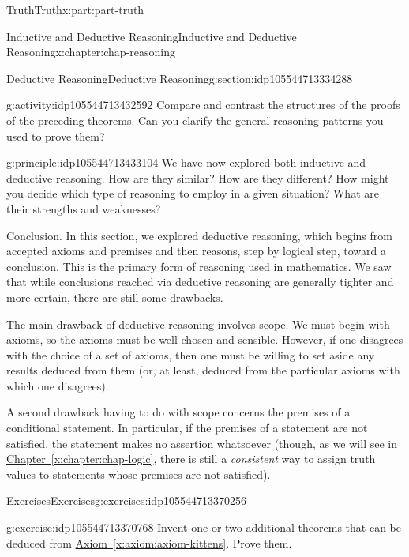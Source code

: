 \documentclass[oneside,10pt,]{book}
\newcommand{\xreffont}{\relax}
\numberwithin{equation}{section}
\begin{document}
\begin{partptx}{Truth}{}{Truth}{}{}{x:part:part-truth}
\begin{chapterptx}{Inductive and Deductive Reasoning}{}{Inductive and Deductive Reasoning}{}{}{x:chapter:chap-reasoning}
\begin{sectionptx}{Deductive Reasoning}{}{Deductive Reasoning}{}{}{g:section:idp105544713334288}
\begin{activity}{}{g:activity:idp105544713432592}
Compare and contrast the structures of the proofs of the preceding theorems. Can you clarify the general reasoning patterns you used to prove them?%
\end{activity}%
\begin{principle}{}{}{g:principle:idp105544713433104}%
We have now explored both inductive and deductive reasoning. How are they similar? How are they different? How might you decide which type of reasoning to employ in a given situation? What are their strengths and weaknesses?%
\end{principle}
\begin{conclusion}{Conclusion.}%
In this section, we explored deductive reasoning, which begins from accepted axioms and premises and then reasons, step by logical step, toward a conclusion. This is the primary form of reasoning used in mathematics. We saw that while conclusions reached via deductive reasoning are generally tighter and more certain, there are still some drawbacks.%
\par
The main drawback of deductive reasoning involves scope. We must begin with axioms, so the axioms must be well-chosen and sensible. However, if one disagrees with the choice of a set of axioms, then one must be willing to set aside any results deduced from them (or, at least, deduced from the particular axioms with which one disagrees).%
\par
A second drawback having to do with scope concerns the premises of a conditional statement. In particular, if the premises of a statement are not satisfied, the statement makes no assertion whatsoever (though, as we will see in \hyperref[x:chapter:chap-logic]{Chapter~{\xreffont\ref{x:chapter:chap-logic}}}, there is still a \emph{consistent} way to assign truth values to statements whose premises are not satisfied).%
\end{conclusion}%
%
%
\typeout{************************************************}
\typeout{************************************************}
%
\begin{exercises-subsection-numberless}{Exercises}{}{Exercises}{}{}{g:exercises:idp105544713370256}
\begin{divisionexercise}{1}{}{}{g:exercise:idp105544713370768}%
Invent one or two additional theorems that can be deduced from \hyperref[x:axiom:axiom-kittens]{Axiom~{\xreffont\ref{x:axiom:axiom-kittens}}}. Prove them.%
\end{divisionexercise}%
\end{exercises-subsection-numberless}

\end{sectionptx}
\end{chapterptx}
\end{partptx}
\end{document}
